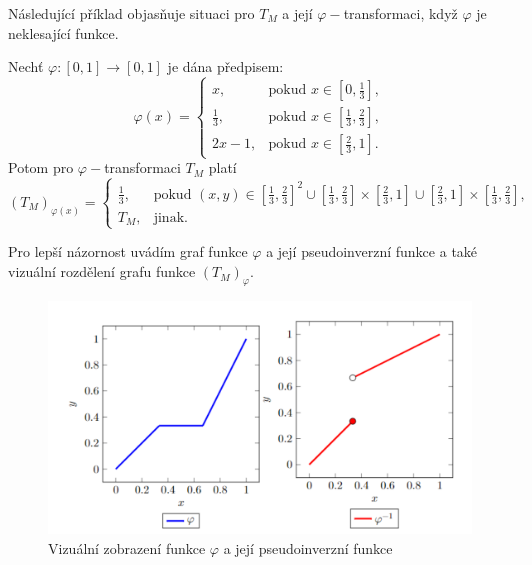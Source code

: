   
  N\'asleduj\'ic\'i p\v r\'iklad objas\v nuje situaci pro $T_M$ a jej\'i $\varphi-$transformaci, kdy\v z $\varphi$ je neklesaj\'ic\'i funkce. 
\begin{example}
\label{sub: fi}
Nech\v t $\varphi:[0,1] \to [0,1]$ je d\'ana p\v redpisem:    
 $$\varphi(x) = \begin{cases} x, & \mbox {pokud } x \in [0,\frac{1}{3}],
    \\ \frac{1}{3}, & \mbox {pokud } x \in [\frac{1}{3}, \frac{2}{3}],\\
    2x - 1, & \mbox {pokud } x \in [\frac{2}{3}, 1].
    \end{cases}$$
Potom pro $\varphi-$transformaci $T_M$ plat\'i
$$(T_M)_{\varphi(x)} = \begin{cases} \frac{1}{3}, & \mbox {pokud } (x, y) \in [\frac{1}{3},\frac{2}{3}]^2 \cup [\frac{1}{3}, \frac{2}{3}] \times [\frac{2}{3}, 1] \cup [\frac{2}{3}, 1] \times [\frac{1}{3}, \frac{2}{3}],\\
    T_M, & \mbox {jinak.}
    \end{cases}$$
\end{example}
Pro lep\v s\'i n\'azornost uv\'ad\'im graf  funkce $\varphi$ a jej\'i pseudoinverzn\'i funkce a tak\'e vizu\'aln\'i rozd\v elen\'i grafu funkce $\left(T_M\right)_\varphi.$\\

   
\begin{figure}[H]
\caption{ Vizu\' aln\' i zobrazení funkce $\varphi$ a jej\'i pseudoinverzn\'i funkce}
                \hspace{-1cm}
                \includegraphics[scale=0.70]{template-fig/phi_transform.pdf}
                \centering
            \end{figure}

